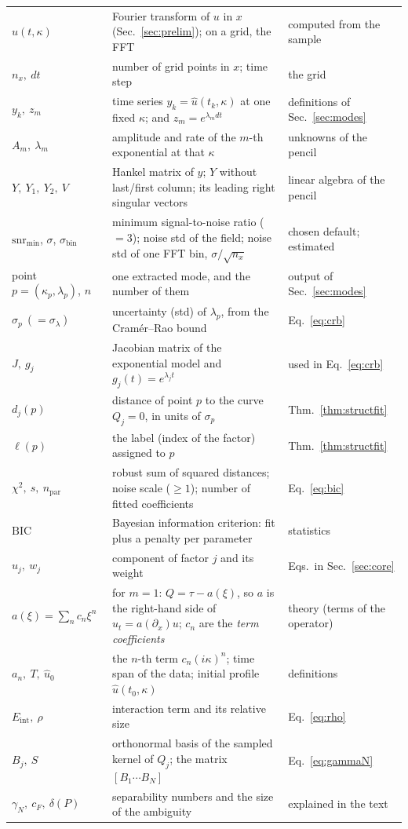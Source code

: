 \documentclass[11pt,a4paper]{article}
\theoremstyle{definition}
\newcommand{\Eint}{E_{\mathrm{int}}}
\begin{document}
\begin{symbols}
\begin{tabular}{@{}L{2.5cm}L{6.0cm}L{4.4cm}@{}}
$\hat u(t,\kappa)$ & Fourier transform of $u$ in $x$ (Sec.~\ref{sec:prelim}); on a grid, the FFT & computed from the sample\\
$n_x,\ dt$ & number of grid points in $x$; time step & the grid\\
$y_k,\ z_m$ & time series $y_k=\hat u(t_k,\kappa)$ at one fixed $\kappa$; and $z_m=e^{\lambda_mdt}$ & definitions of Sec.~\ref{sec:modes}\\
$A_m,\ \lambda_m$ & amplitude and rate of the $m$-th exponential at that $\kappa$ & unknowns of the pencil\\
$Y,\ Y_1,\ Y_2,\ V$ & Hankel matrix of $y$; $Y$ without last/first column; its leading right singular vectors & linear algebra of the pencil\\
$\mathrm{snr}_{\min}$, $\sigma$, $\sigma_{\mathrm{bin}}$ & minimum signal-to-noise ratio ($=3$); noise std of the field; noise std of one FFT bin, $\sigma/\sqrt{n_x}$ & chosen default; estimated\\
point $p=(\kappa_p,\lambda_p)$, $n$ & one extracted mode, and the number of them & output of Sec.~\ref{sec:modes}\\
$\sigma_p\ (=\sigma_\lambda)$ & uncertainty (std) of $\lambda_p$, from the Cram\'er--Rao bound & Eq.~\eqref{eq:crb}\\
$J,\ g_j$ & Jacobian matrix of the exponential model and $g_j(t)=e^{\lambda_jt}$ & used in Eq.~\eqref{eq:crb}\\
$d_j(p)$ & distance of point $p$ to the curve $Q_j=0$, in units of $\sigma_p$ & Thm.~\ref{thm:structfit}\\
$\ell(p)$ & the label (index of the factor) assigned to $p$ & Thm.~\ref{thm:structfit}\\
$\chi^2,\ s,\ n_{\mathrm{par}}$ & robust sum of squared distances; noise scale ($\ge1$); number of fitted coefficients & Eq.~\eqref{eq:bic}\\
$\mathrm{BIC}$ & Bayesian information criterion: fit plus a penalty per parameter & statistics\\
$u_j,\ w_j$ & component of factor $j$ and its weight & Eqs.~in Sec.~\ref{sec:core}\\
$a(\xi)=\sum_nc_n\xi^n$ & for $m=1$: $Q=\tau-a(\xi)$, so $a$ is the right-hand side of $u_t=a(\partial_x)u$; $c_n$ are the \emph{term coefficients} & theory (terms of the operator)\\
$a_n,\ T,\ \hat u_0$ & the $n$-th term $c_n(i\kappa)^n$; time span of the data; initial profile $\hat u(t_0,\kappa)$ & definitions\\
$\Eint,\ \rho$ & interaction term and its relative size & Eq.~\eqref{eq:rho}\\
$B_j,\ S$ & orthonormal basis of the sampled kernel of $Q_j$; the matrix $[B_1\cdots B_N]$ & Eq.~\eqref{eq:gammaN}\\
$\gamma_N,\ c_F,\ \delta(P)$ & separability numbers and the size of the ambiguity & explained in the text\\
\end{tabular}
\end{symbols}
\end{document}
